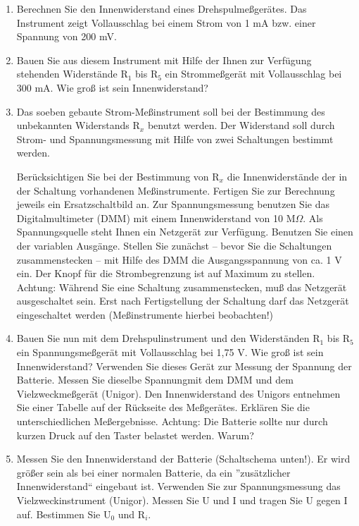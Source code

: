 \documentclass[12pt]{scrartcl}
\begin{document}
\begin{enumerate}

	\item 
	Berechnen Sie den Innenwiderstand 			eines Drehspulmeßgerätes. Das Instrument
	zeigt Vollausschlag bei einem Strom von 		1 mA bzw. einer Spannung von 200 mV.
	\item
	Bauen Sie aus diesem Instrument mit 			Hilfe der Ihnen zur Verfügung stehenden 		Widerstände $\text{R}_1$ bis 				$\text{R}_5$ ein 							Strommeßgerät mit Vollausschlag bei 300 		mA. Wie groß ist sein Innenwiderstand?
	\item
	Das soeben gebaute Strom-Meßinstrument 		soll bei der Bestimmung des unbekannten 		Widerstands $\text{R}_x$ benutzt werden. 	Der Widerstand soll durch Strom- und 		Spannungsmessung mit Hilfe von zwei 			Schaltungen bestimmt werden.
	
	
	Berücksichtigen Sie bei 	der Bestimmung 		von $\text{R}_x$ die Innenwiderstände 		der in der Schaltung vorhandenen 			Meßinstrumente. Fertigen Sie zur 			Berechnung jeweils ein Ersatzschaltbild 		an. Zur Spannungsmessung benutzen Sie 		das Digitalmultimeter (DMM) mit einem 		Innenwiderstand von 10 M$\Omega$. Als 		Spannungsquelle steht Ihnen ein 				Netzgerät zur Verfügung. Benutzen Sie 		einen der variablen Ausgänge. Stellen 		Sie zunächst -- bevor Sie die 				Schaltungen 	zusammenstecken -- mit Hilfe 	des DMM die Ausgangsspannung von ca. 		1 V ein. Der Knopf für die 					Strombegrenzung ist auf Maximum zu 			stellen. Achtung: Während Sie 	eine 		Schaltung zusammenstecken, muß das 			Netzgerät ausgeschaltet sein. Erst nach 		Fertigstellung der Schaltung darf das 		Netzgerät eingeschaltet werden 				(Meßinstrumente hierbei beobachten!)
	\item
	Bauen Sie nun mit dem Drehspulinstrument 	und den Widerständen $\text{R}_1$ bis 		$\text{R}_5$ ein Spannungsmeßgerät mit 		Vollausschlag bei 1,75 V. Wie groß ist 		sein Innenwiderstand? Verwenden Sie 			dieses Gerät zur Messung der Spannung 		der Batterie. Messen Sie dieselbe 			Spannungmit dem DMM und dem 					Vielzweckmeßgerät (Unigor). Den 				Innenwiderstand des Unigors entnehmen 		Sie einer Tabelle auf der Rückseite des 		Meßgerätes. Erklären Sie die 				unterschiedlichen Meßergebnisse.
	Achtung: Die Batterie sollte nur durch 		kurzen Druck auf den Taster belastet 		werden. Warum?
	\item
	Messen Sie den Innenwiderstand der 			Batterie (Schaltschema unten!). Er wird 		größer sein als bei einer normalen 			Batterie, da ein ”zusätzlicher 				Innenwiderstand“ eingebaut ist. 				Verwenden Sie zur Spannungsmessung das 		Vielzweckinstrument (Unigor). Messen Sie
	U und I und tragen Sie U gegen I auf. 		Bestimmen Sie $\text{U}_0$ und 				$\text{R}_i$.
	

\end{enumerate}
\end{document}
